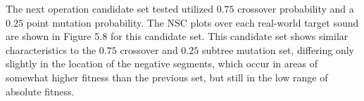 \documentclass[a4paper,12pt]{report} 	%
\numberwithin{figure}{chapter}
\numberwithin{table}{chapter}
\numberwithin{equation}{chapter}
\begin{document}
\begin{flushleft}
The next operation candidate set tested utilized $0.75$ crossover probability and a $0.25$ point mutation probability. The NSC plots over each real-world target sound are shown in Figure 5.8 for this candidate set.
This candidate set shows similar characteristics to the $0.75$ crossover and $0.25$ subtree mutation set, differing only slightly in the location of the negative segments, which occur in areas of somewhat higher fitness than the previous set, but still in the low range of absolute fitness.


\end{flushleft}
\end{document}
